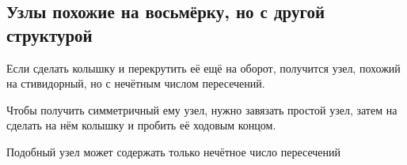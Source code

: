 \subsection{Узлы похожие на восьмёрку, но с другой структурой}

Если сделать колышку и перекрутить её ещё на оборот, получится узел, похожий на стивидорный, но с нечётным числом пересечений.

Чтобы получить симметричный ему узел, нужно завязать простой узел, затем на сделать на нём колышку и пробить её ходовым концом.

Подобный узел может содержать только нечётное число пересечений

